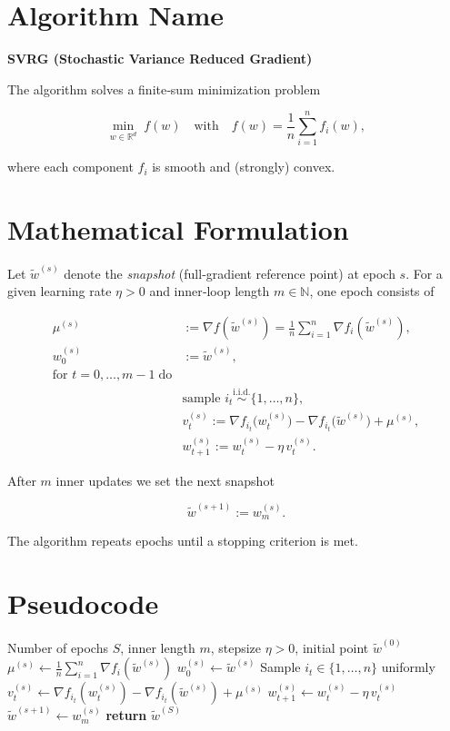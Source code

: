 \documentclass[11pt]{article}
\newcommand{\R}{\mathbb{R}}
\begin{document}
\section*{Algorithm Name}
\textbf{SVRG (Stochastic Variance Reduced Gradient)}  

The algorithm solves a finite‑sum minimization problem  

\[
\min_{w\in\R^{d}} \; f(w)\quad\text{with}\quad 
f(w)=\frac{1}{n}\sum_{i=1}^{n} f_i(w),
\]

where each component $f_i$ is smooth and (strongly) convex.

\section*{Mathematical Formulation}
Let $\tilde w^{(s)}$ denote the \emph{snapshot} (full‑gradient reference point) at epoch $s$.
For a given learning rate $\eta>0$ and inner‑loop length $m\in\mathbb{N}$, one epoch consists of

\[
\begin{aligned}
\mu^{(s)} &:= \nabla f(\tilde w^{(s)}) 
           = \frac{1}{n}\sum_{i=1}^{n}\nabla f_i(\tilde w^{(s)}), \\
w_{0}^{(s)} &:= \tilde w^{(s)},\\[4pt]
\text{for }t=0,\dots,m-1\; \text{do}\\
\qquad &\text{sample }i_t\stackrel{\text{i.i.d.}}{\sim}\{1,\dots,n\},\\
\qquad &v_t^{(s)} := \nabla f_{i_t}\!\bigl(w_{t}^{(s)}\bigr)
                -\nabla f_{i_t}\!\bigl(\tilde w^{(s)}\bigr) + \mu^{(s)},\\
\qquad &w_{t+1}^{(s)} := w_{t}^{(s)} - \eta\, v_t^{(s)} .
\end{aligned}
\]

After $m$ inner updates we set the next snapshot  

\[
\tilde w^{(s+1)} := w_{m}^{(s)} .
\]

The algorithm repeats epochs until a stopping criterion is met.

\section*{Pseudocode}
\begin{algorithm}[H]
\caption{SVRG}
\begin{algorithmic}[1]
\Require Number of epochs $S$, inner length $m$, stepsize $\eta>0$, initial point $\tilde w^{(0)}$
    \State $\displaystyle \mu^{(s)} \gets \frac1n\sum_{i=1}^{n}\nabla f_i(\tilde w^{(s)})$ 
    \State $w_0^{(s)} \gets \tilde w^{(s)}$
        \State Sample $i_t\in\{1,\dots,n\}$ uniformly
        \State $v_t^{(s)} \gets \nabla f_{i_t}(w_t^{(s)})-\nabla f_{i_t}(\tilde w^{(s)})+\mu^{(s)}$
        \State $w_{t+1}^{(s)} \gets w_t^{(s)}-\eta\,v_t^{(s)}$
    \EndFor
    \State $\tilde w^{(s+1)} \gets w_{m}^{(s)}$
\EndFor
\State \textbf{return} $\tilde w^{(S)}$
\end{algorithmic}
\end{algorithm}
\end{document}
